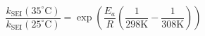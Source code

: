 \documentclass[preview]{standalone}
\begin{document}
\[
\frac{k_{\mathrm{SEI}}(35^\circ\mathrm{C})}{k_{\mathrm{SEI}}(25^\circ\mathrm{C})}
= \exp\left(\frac{E_a}{R}\left(\frac{1}{298\mathrm{K}} - \frac{1}{308\mathrm{K}}\right)\right)
\]
\end{document}
